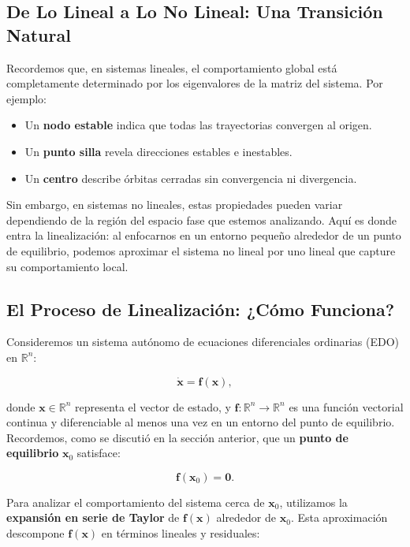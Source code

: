 \subsection{De Lo Lineal a Lo No Lineal: Una Transición Natural}

Recordemos que, en sistemas lineales, el comportamiento global está completamente determinado por los eigenvalores de la matriz del sistema. Por ejemplo:
\begin{itemize} 
    \item Un \textbf{nodo estable} indica que todas las trayectorias convergen al origen.
    \item Un \textbf{punto silla} revela direcciones estables e inestables.
    \item Un \textbf{centro} describe órbitas cerradas sin convergencia ni divergencia.
\end{itemize}

Sin embargo, en sistemas no lineales, estas propiedades pueden variar dependiendo de la región del espacio fase que estemos analizando. Aquí es donde entra la linealización: al enfocarnos en un entorno pequeño alrededor de un punto de equilibrio, podemos aproximar el sistema no lineal por uno lineal que capture su comportamiento local.

\subsection{El Proceso de Linealización: ¿Cómo Funciona?}

Consideremos un sistema autónomo de ecuaciones diferenciales ordinarias (EDO) en $\mathbb{R}^n$:

\begin{equation}\label{eq:sistema_no_lineal}
    \dot{\mathbf{x}} = \mathbf{f}(\mathbf{x}),
\end{equation}

donde $\mathbf{x} \in \mathbb{R}^n$ representa el vector de estado, y $\mathbf{f}: \mathbb{R}^n \to \mathbb{R}^n$ es una función vectorial continua y diferenciable al menos una vez en un entorno del punto de equilibrio. Recordemos, como se discutió en la sección anterior, que un \textbf{punto de equilibrio} $\mathbf{x}_0$ satisface:

\begin{equation}
    \mathbf{f}(\mathbf{x}_0) = \mathbf{0}.
\end{equation}

Para analizar el comportamiento del sistema cerca de $\mathbf{x}_0$, utilizamos la \textbf{expansión en serie de Taylor} de $\mathbf{f}(\mathbf{x})$ alrededor de $\mathbf{x}_0$. Esta aproximación descompone $\mathbf{f}(\mathbf{x})$ en términos lineales y residuales:

